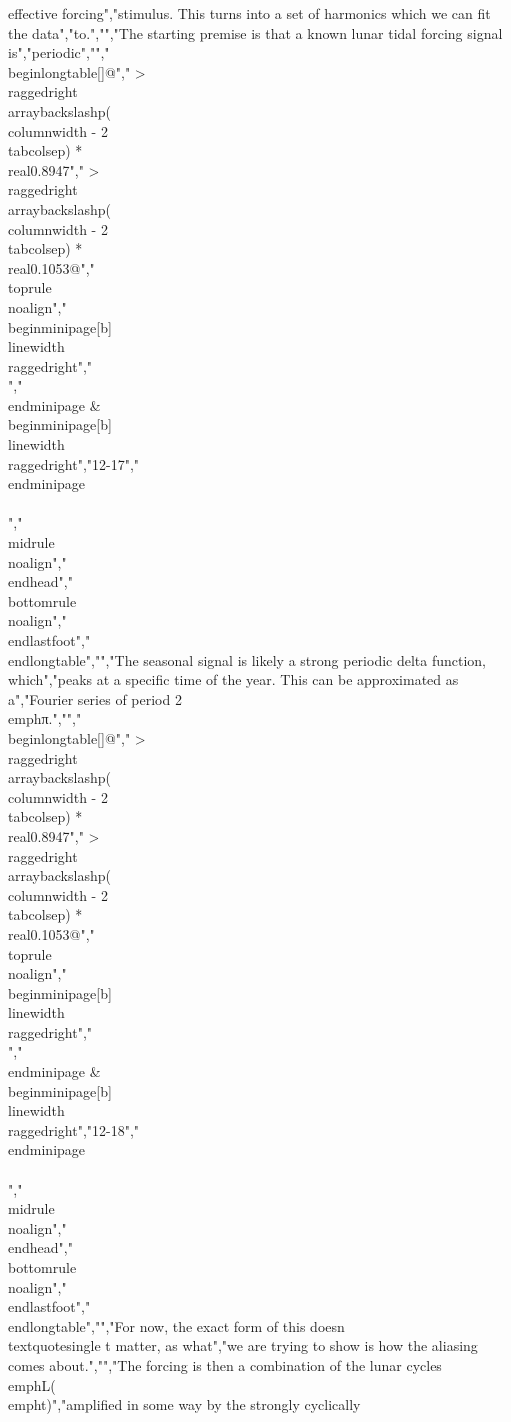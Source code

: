 {{{{{{{{{{effective forcing","stimulus. This turns into a set of harmonics which we can fit the data","to.","","The starting premise is that a known lunar tidal forcing signal is","periodic","","\\begin{longtable}[]{@{}","  >{\\raggedright\\arraybackslash}p{(\\columnwidth - 2\\tabcolsep) * \\real{0.8947}}","  >{\\raggedright\\arraybackslash}p{(\\columnwidth - 2\\tabcolsep) * \\real{0.1053}}@{}}","\\toprule\\noalign{}","\\begin{minipage}[b]{\\linewidth}\\raggedright","\\[L(t) = k \\cdot sin(\\omega_{L}t + \\phi)\\]","\\end{minipage} & \\begin{minipage}[b]{\\linewidth}\\raggedright","12-17","\\end{minipage} \\\\","\\midrule\\noalign{}","\\endhead","\\bottomrule\\noalign{}","\\endlastfoot","\\end{longtable}","","The seasonal signal is likely a strong periodic delta function, which","peaks at a specific time of the year. This can be approximated as a","Fourier series of period 2\\emph{π}.","","\\begin{longtable}[]{@{}","  >{\\raggedright\\arraybackslash}p{(\\columnwidth - 2\\tabcolsep) * \\real{0.8947}}","  >{\\raggedright\\arraybackslash}p{(\\columnwidth - 2\\tabcolsep) * \\real{0.1053}}@{}}","\\toprule\\noalign{}","\\begin{minipage}[b]{\\linewidth}\\raggedright","\\[s(t) = \\sum_{i = 1}^{n}{a_{i}sin(2\\pi ti + \\theta_{i})}\\]","\\end{minipage} & \\begin{minipage}[b]{\\linewidth}\\raggedright","12-18","\\end{minipage} \\\\","\\midrule\\noalign{}","\\endhead","\\bottomrule\\noalign{}","\\endlastfoot","\\end{longtable}","","For now, the exact form of this doesn\\textquotesingle t matter, as what","we are trying to show is how the aliasing comes about.","","The forcing is then a combination of the lunar cycles \\emph{L}(\\emph{t})","amplified in some way by the strongly cyclically }}}}}}}}}}
